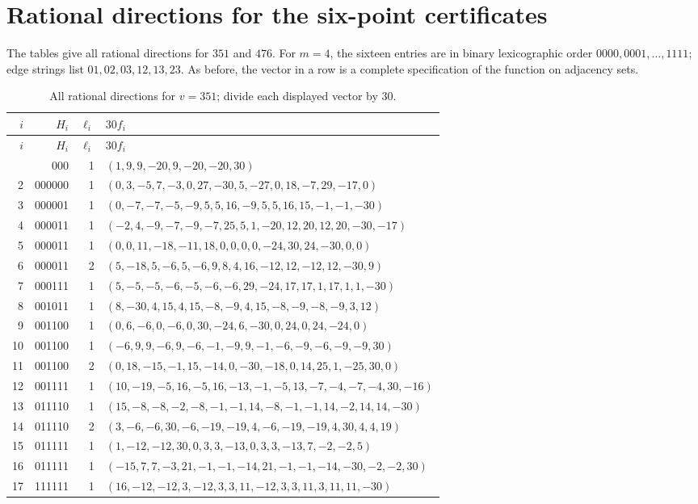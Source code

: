\documentclass[11pt]{article}
\theoremstyle{remark}
\numberwithin{equation}{section}
\begin{document}
\section{Rational directions for the six-point certificates}\label{app:directions}
The tables give all rational directions for $351$ and $476$.  For $m=4$, the sixteen
entries are in binary lexicographic order $0000,0001,\ldots,1111$;
edge strings list $01,02,03,12,13,23$.  As before, the vector in a row
is a complete specification of the function on adjacency sets.

\begingroup\small\begin{longtable}{rrrl}
\caption{All rational directions for $v=351$; divide each displayed vector by $30$.}\label{tab:direct-directions-351}\\
\toprule $i$&$H_i$&$\ell_i$&$30f_i$\\\midrule\endfirsthead
\toprule $i$&$H_i$&$\ell_i$&$30f_i$\\\midrule\endhead
\bottomrule\endfoot
1&000&1&\scriptsize $(1,9,9,-20,9,-20,-20,30)$\\
2&000000&1&\scriptsize $(0,3,-5,7,-3,0,27,-30,5,-27,0,18,-7,29,-17,0)$\\
3&000001&1&\scriptsize $(0,-7,-7,-5,-9,5,5,16,-9,5,5,16,15,-1,-1,-30)$\\
4&000011&1&\scriptsize $(-2,4,-9,-7,-9,-7,25,5,1,-20,12,20,12,20,-30,-17)$\\
5&000011&1&\scriptsize $(0,0,11,-18,-11,18,0,0,0,0,-24,30,24,-30,0,0)$\\
6&000011&2&\scriptsize $(5,-18,5,-6,5,-6,9,8,4,16,-12,12,-12,12,-30,9)$\\
7&000111&1&\scriptsize $(5,-5,-5,-6,-5,-6,-6,29,-24,17,17,1,17,1,1,-30)$\\
8&001011&1&\scriptsize $(8,-30,4,15,4,15,-8,-9,4,15,-8,-9,-8,-9,3,12)$\\
9&001100&1&\scriptsize $(0,6,-6,0,-6,0,30,-24,6,-30,0,24,0,24,-24,0)$\\
10&001100&1&\scriptsize $(-6,9,9,-6,9,-6,-1,-9,9,-1,-6,-9,-6,-9,-9,30)$\\
11&001100&2&\scriptsize $(0,18,-15,-1,15,-14,0,-30,-18,0,14,25,1,-25,30,0)$\\
12&001111&1&\scriptsize $(10,-19,-5,16,-5,16,-13,-1,-5,13,-7,-4,-7,-4,30,-16)$\\
13&011110&1&\scriptsize $(15,-8,-8,-2,-8,-1,-1,14,-8,-1,-1,14,-2,14,14,-30)$\\
14&011110&2&\scriptsize $(3,-6,-6,30,-6,-19,-19,4,-6,-19,-19,4,30,4,4,19)$\\
15&011111&1&\scriptsize $(1,-12,-12,30,0,3,3,-13,0,3,3,-13,7,-2,-2,5)$\\
16&011111&1&\scriptsize $(-15,7,7,-3,21,-1,-1,-14,21,-1,-1,-14,-30,-2,-2,30)$\\
17&111111&1&\scriptsize $(16,-12,-12,3,-12,3,3,11,-12,3,3,11,3,11,11,-30)$\\
\end{longtable}\endgroup
\end{document}
